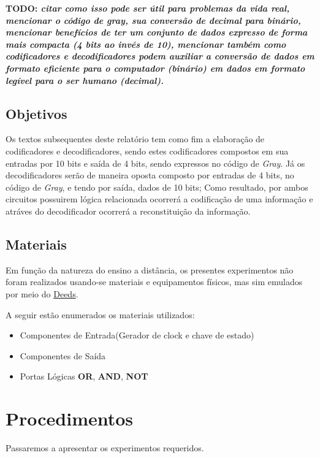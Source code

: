 \documentclass[12pt]{article}
\begin{document}
\textbf{TODO: \emph{citar como isso pode ser útil para problemas da vida real,
    mencionar o código de gray, sua conversão de decimal para binário, mencionar
    benefícios de ter um conjunto de dados expresso de forma mais compacta (4
    bits ao invés de 10), mencionar também como codificadores e decodificadores
    podem auxiliar a conversão de dados em formato eficiente para o computador
    (binário) em dados em formato legível para o ser humano (decimal). }}

\subsection{Objetivos}
\label{sec:Objetivos}

Os textos subsequentes deste relatório tem como fim a elaboração de
codificadores e decodificadores, sendo estes codificadores compostos em sua
entradas por 10 bits e saída de 4 bits, sendo expressos no código de
\emph{Gray}. Já os decodificadores serão de maneira oposta composto por entradas
de 4 bits, no código de \emph{Gray}, e tendo por saída, dados de 10 bits; Como
resultado, por ambos circuitos possuirem lógica relacionada ocorrerá a
codificação de uma informação e atráves do decodificador ocorrerá a
reconstituição da informação.

\subsection{Materiais}
\label{sec:Materiais}
Em função da natureza do ensino a distância, os presentes experimentos não foram
realizados usando-se materiais e equipamentos físicos, mas sim emulados por meio
do \href{https://www.digitalelectronicsdeeds.com/deeds.html}{Deeds}.

A seguir estão enumerados os materiais utilizados:
\begin{itemize}
    \item Componentes de Entrada(Gerador de clock e chave de estado)
    \item Componentes de Saída
    \item Portas Lógicas \textbf{OR}, \textbf{AND}, \textbf{NOT}
\end{itemize}

\section{Procedimentos}
\label{sec:Procedimentos}

Passaremos a apresentar os experimentos requeridos.
\end{document}
